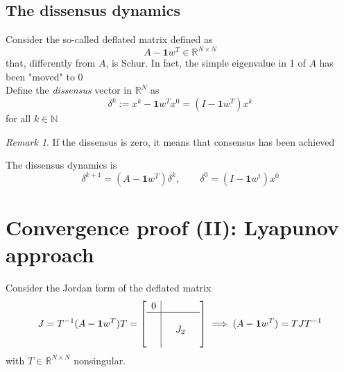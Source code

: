 \documentclass{book}
\newcommand{\R}{\mathbb{R}}
\newcommand{\N}{\mathbb{N}}
\theoremstyle{theoremv2}
\theoremstyle{defv2}
\theoremstyle{remark}
\newtheorem*{remark}{Remark}
\theoremstyle{remark}
\theoremstyle{definition}
\theoremstyle{definition}
\begin{document}
\subsection{The dissensus dynamics}
Consider the so-called deflated matrix defined as 
\[
    A- \boldsymbol{1}w^T\in\R^{N\times N}
\]
that, differently from $A$, is Schur. In fact, the simple eigenvalue in 1 of $A$ has been "moved" to 0
\\Define the \emph{dissensus} vector in $\R^N$ as 
\[
    \delta^k := x^k- \boldsymbol{1}w^Tx^0 = (I-\boldsymbol{1}w^T)x^k
\]
for all $k\in\N$
\begin{remark}
    If the dissensus is zero, it means that consensus has been achieved
\end{remark}
The dissensus dynamics is 
\[
    \delta^{k+1} = (A-\boldsymbol{1}w^T)\delta^k, \qquad \delta^0 = (I-\boldsymbol{1}w^t)x^0
\]
\section{Convergence proof (II): Lyapunov approach}
Consider the Jordan form of the deflated matrix
\[
    J = T^{-1} (A-\boldsymbol{1}w^T)T = \left[\begin{array}{c| c c c }
        0 & & & \\ \hline \\ & & J_2 & \\ & & & 
    \end{array}\right] \implies (A-\boldsymbol{1}w^T) = TJT^{-1}
\]
with $T\in\R^{N\times N}$ nonsingular.
\end{document}
